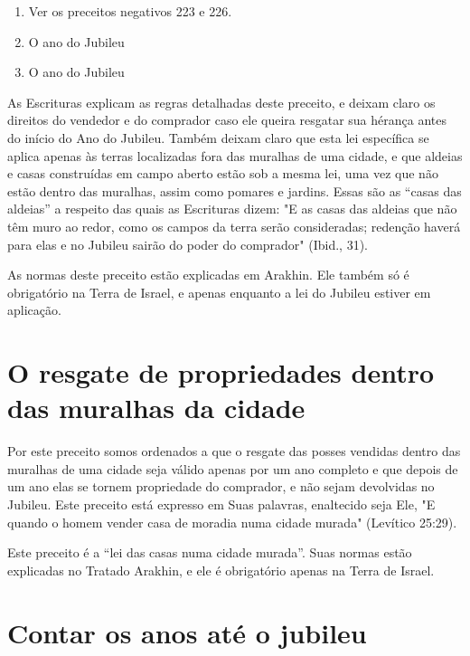 \begin{enumerate}
\def\labelenumi{\arabic{enumi}.}
\setcounter{enumi}{172}
\item
 
 Ver os preceitos negativos 223 e 226.
 
\item
 
 O ano do Jubileu
 
\item
 
 O ano do Jubileu
 
\end{enumerate}

As Escrituras explicam as regras detalhadas deste preceito, e deixam
claro os direitos do vendedor e do comprador caso ele queira resgatar
sua hé­rança antes do início do Ano do Jubileu. Também deixam claro que
esta lei es­pecífica se aplica apenas às terras localizadas fora das
muralhas de uma cidade, e que aldeias e casas construídas em campo
aberto estão sob a mesma lei, uma vez que não estão dentro das muralhas,
assim como pomares e jardins. Essas são as ``casas das aldeias'' a
respeito das quais as Escrituras dizem: "E as casas das aldeias que não
têm muro ao redor, como os campos da terra serão consi­deradas; redenção
haverá para elas e no Jubileu sairão do poder do compra­dor" (Ibid.,
31).

As normas deste preceito estão explicadas em Arakhin. Ele também só é
obrigatório na Terra de Israel, e apenas enquanto a lei do Jubileu
estiver em aplicação.

\section{O resgate de propriedades dentro das muralhas da cidade}

Por este preceito somos ordenados a que o resgate das posses ven­didas
dentro das muralhas de uma cidade seja válido apenas por um ano
com­pleto e que depois de um ano elas se tornem propriedade do
comprador, e não sejam devolvidas no Jubileu. Este preceito está
expresso em Suas palavras, enal­tecido seja Ele, "E quando o homem
vender casa de moradia numa cidade mu­rada" (Levítico 25:29).

Este preceito é a ``lei das casas numa cidade murada''. Suas normas estão
explicadas no Tratado Arakhin, e ele é obrigatório apenas na Terra de
Israel.

\section{Contar os anos até o jubileu}

